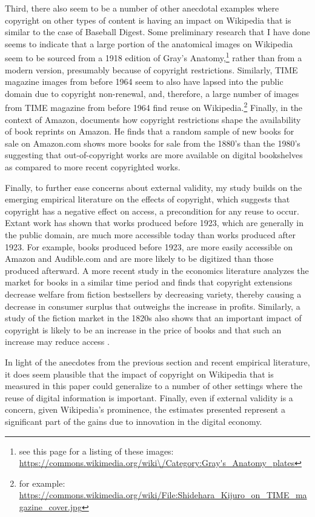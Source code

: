 \documentclass[11pt]{article}
\begin{document}
Third, there also seem to be a number of other anecdotal examples where copyright on other types of content is having an impact on Wikipedia that is similar to the case of Baseball Digest. Some preliminary research that I have done seems to indicate that a large portion of the anatomical images on Wikipedia seem to be sourced from a 1918 edition of Gray's Anatomy,\footnote{see this page for a listing of these images: \url{https://commons.wikimedia.org/wiki\/Category:Gray's_Anatomy_plates}} rather than from a modern version, presumably because of copyright restrictions. Similarly, TIME magazine images from before 1964 seem to also have lapsed into the public domain due to copyright non-renewal, and, therefore, a large number of images from TIME magazine from before 1964 find reuse on Wikipedia.\footnote{for example: \url{https://commons.wikimedia.org/wiki/File:Shidehara_Kijuro_on_TIME_magazine_cover.jpg}} Finally, in the context of Amazon, \cite{heald_how_2013} documents how copyright restrictions shape the availability of book reprints on Amazon. He finds that a random sample of new books for sale on Amazon.com shows more books for sale from the 1880's than the 1980's suggesting that out-of-copyright works are more available on digital bookshelves as compared to more recent copyrighted works.

Finally, to further ease concerns about external validity, my study builds on the emerging empirical literature on the effects of copyright, which suggests that copyright has a negative effect on access, a precondition for any reuse to occur. Extant work \citep{heald_property_2007, heald_does_2009, buccafusco_bad_2012} has shown that works produced before 1923, which are generally in the public domain, are much more accessible today than works produced after 1923. For example, books produced before 1923, are more easily accessible on Amazon and Audible.com and are more likely to be digitized \citep{brooks_how_2005} than those produced afterward. A more recent study in the economics literature \citep{reimers_effects_2013} analyzes the market for books in a similar time period and finds that copyright extensions decrease welfare from fiction bestsellers by decreasing variety, thereby causing a decrease in consumer surplus that outweighs the increase in profits. Similarly, a study of the fiction market in the 1820s also shows that an important impact of copyright is likely to be an increase in the price of books and that such an increase may reduce access \citep{li_dead_2012}. 

In light of the anecdotes from the previous section and recent empirical literature, it does seem plausible that the impact of copyright on Wikipedia that is measured in this paper could generalize to a number of other settings where the reuse of digital information is important. Finally, even if external validity is a concern, given Wikipedia's prominence, the estimates presented represent a significant part of the gains due to innovation in the digital economy.
\end{document}
